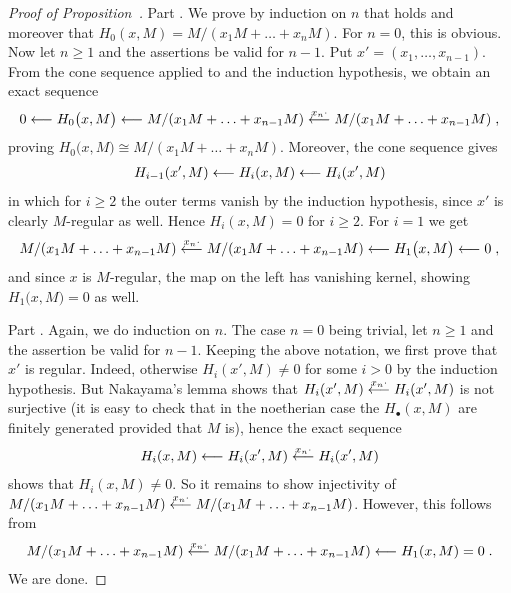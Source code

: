 \documentclass[a4paper,parskip=half,numbers=enddot, DIV=12]{scrreprt}
\renewcommand{\geq}{\geqslant}
\begin{document}
\begin{proof}[Proof of Proposition~]
	Part . We prove by induction on $n$ that  holds and moreover that $H_0(x,M)=M/(x_1M+\ldots+x_nM)$. For $n=0$, this is obvious. Now let $n\geq 1$ and the assertions be valid for $n-1$. Put $x'=(x_1,\ldots,x_{n-1})$. From the cone sequence  applied to  and the induction hypothesis, we obtain an exact sequence
	\begin{align*}
		0\lmorphism H_0\big(x,M\big)\lmorphism M/(x_1M+\ldots+x_{n-1}M)\lmorphism[x_n\cdot]M/(x_1M+\ldots+x_{n-1}M)\;,
	\end{align*}
	proving $H_0\big(x,M\big)\cong M/(x_1M+\ldots+x_nM)$. Moreover, the cone sequence gives 
	\begin{align*}
		H_{i-1}(x',M)\lmorphism H_i(x,M)\lmorphism H_i(x',M)
	\end{align*}
	in which for $i\geq 2$ the outer terms vanish by the induction hypothesis, since $x'$ is clearly $M$-regular as well. Hence $H_i(x,M)=0$ for $i\geq 2$. For $i=1$ we get
	\begin{align*}
		M/(x_1M+\ldots+x_{n-1}M)\lmorphism[x_n\cdot]M/(x_1M+\ldots+x_{n-1}M)\lmorphism H_1\big(x,M\big)\lmorphism 0\;,
	\end{align*}
	and since $x$ is $M$-regular, the map on the left has vanishing kernel, showing $H_1\big(x,M\big)=0$ as well.
	
	Part . Again, we do induction on $n$. The case $n=0$ being trivial, let $n\geq 1$ and the assertion be valid for $n-1$. Keeping the above notation, we first prove that $x'$ is regular. Indeed, otherwise $H_i(x',M)\neq 0$ for some $i>0$ by the induction hypothesis. But Nakayama's lemma shows that $H_i(x',M)\lmorphism[x_n\cdot]H_i(x',M)$ is not surjective (it is easy to check that in the noetherian case the $H_\bullet(x,M)$ are finitely generated provided that $M$ is), hence the exact sequence
	\begin{align*}
		H_i(x,M)\lmorphism H_i(x',M)\lmorphism[x_n\cdot]H_i(x',M)
	\end{align*}
	shows that $H_i(x,M)\neq 0$. So it remains to show injectivity of $M/(x_1M+\ldots+x_{n-1}M)\lmorphism[x_n\cdot]M/(x_1M+\ldots+x_{n-1}M)$. However, this follows from
	\begin{align*}
		M/(x_1M+\ldots+x_{n-1}M)\lmorphism[x_n\cdot]M/(x_1M+\ldots+x_{n-1}M)\lmorphism H_1(x,M)=0\;.
	\end{align*}
	We are done.
\end{proof}
\end{document}
